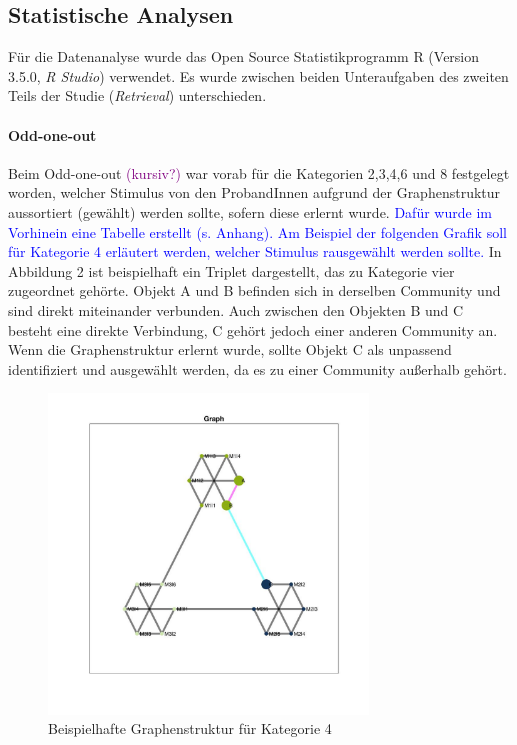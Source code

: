 \documentclass[preprint,12pt]{elsarticle}
\begin{document}
\subsection{Statistische Analysen}
Für die Datenanalyse wurde das Open Source Statistikprogramm R (Version 3.5.0, \textit{R Studio}) verwendet.
Es wurde zwischen beiden Unteraufgaben des zweiten Teils der Studie (\textit{Retrieval}) unterschieden.

\paragraph{Odd-one-out}
Beim Odd-one-out \textcolor{purple}{(kursiv?)} war vorab für die Kategorien 2,3,4,6 und 8 festgelegt worden, welcher Stimulus von den ProbandInnen aufgrund der Graphenstruktur aussortiert (gewählt) werden sollte, sofern diese erlernt wurde. \textcolor{blue}{Dafür wurde im Vorhinein eine Tabelle erstellt (s. Anhang). Am Beispiel der folgenden Grafik soll für Kategorie 4 erläutert werden, welcher Stimulus rausgewählt werden sollte.}
In Abbildung 2 ist beispielhaft ein Triplet dargestellt, das zu Kategorie vier zugeordnet gehörte. Objekt A und B befinden sich in derselben Community und sind direkt miteinander verbunden. Auch zwischen den Objekten B und C besteht eine direkte Verbindung, C gehört jedoch einer anderen Community an. Wenn die Graphenstruktur erlernt wurde, sollte Objekt C als unpassend identifiziert und ausgewählt werden, da es zu einer Community außerhalb gehört.

\begin{figure}[h]
    \centering
    \includegraphics[width=85mm]{cat04_2716_tripletVisual.jpg}
    \caption{Beispielhafte Graphenstruktur für Kategorie 4}
    \label{fig:my_label}
\end{figure}
\end{document}
